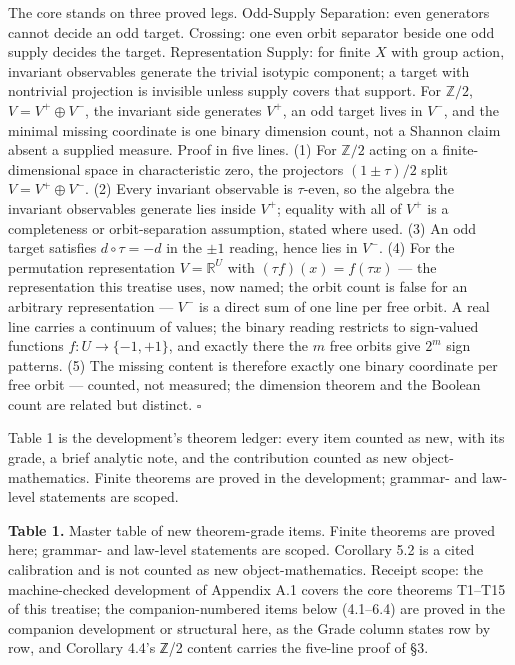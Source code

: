 \documentclass[10pt]{article}
\renewcommand{\_}{\origunderscore\allowbreak}
\begin{document}
The core stands on three proved legs. Odd-Supply Separation: even
generators cannot decide an odd target. Crossing: one even orbit
separator beside one odd supply decides the target. Representation
Supply: for finite \(X\) with group action, invariant observables
generate the trivial isotypic component; a target with nontrivial
projection is invisible unless supply covers that support. For
\(\mathbb Z/2\), \(V=V^+\oplus V^-\), the invariant side generates
\(V^+\), an odd target lives in \(V^-\), and the minimal missing
coordinate is one binary dimension count, not a Shannon claim absent a
supplied measure. Proof in five lines. (1) For \(\mathbb Z/2\) acting on
a finite-dimensional space in characteristic zero, the projectors
\((1\pm\tau)/2\) split \(V = V^+ \oplus V^-\). (2) Every invariant
observable is \(\tau\)-even, so the algebra the invariant observables
generate lies inside \(V^+\); equality with all of \(V^+\) is a
completeness or orbit-separation assumption, stated where used. (3) An
odd target satisfies \(d\circ\tau = -d\) in the \(\pm 1\) reading, hence
lies in \(V^-\). (4) For the permutation representation
\(V = \mathbb{R}^U\) with \((\tau f)(x) = f(\tau x)\) --- the
representation this treatise uses, now named; the orbit count is false
for an arbitrary representation --- \(V^-\) is a direct sum of one line
per free orbit. A real line carries a continuum of values; the binary
reading restricts to sign-valued functions \(f : U \to \{-1,+1\}\), and
exactly there the \(m\) free orbits give \(2^m\) sign patterns. (5) The
missing content is therefore exactly one binary coordinate per free
orbit --- counted, not measured; the dimension theorem and the Boolean
count are related but distinct. \(\square\)

Table 1 is the development's theorem ledger: every item counted as new,
with its grade, a brief analytic note, and the contribution counted as
new object-mathematics. Finite theorems are proved in the development;
grammar- and law-level statements are scoped.

\textbf{Table 1.} Master table of new theorem-grade items. Finite
theorems are proved here; grammar- and law-level statements are scoped.
Corollary 5.2 is a cited calibration and is not counted as new
object-mathematics. Receipt scope: the machine-checked development of
Appendix A.1 covers the core theorems T1--T15 of this treatise; the
companion-numbered items below (4.1--6.4) are proved in the companion
development or structural here, as the Grade column states row by row,
and Corollary 4.4's ℤ/2 content carries the five-line proof of §3.
\end{document}
